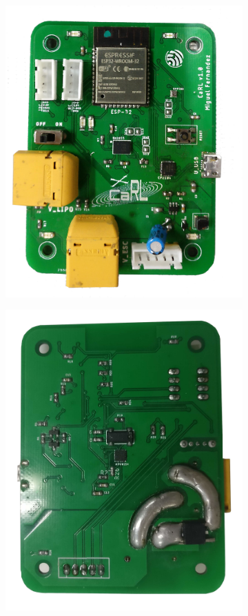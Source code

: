 \begin{figure}[htb!]
	
	\centering
	\begin{subfigure}{0.49\textwidth}
		\centering
		\includegraphics[height=1.2\textwidth]{hardware/AutopilotoFront}
	\end{subfigure}
	\begin{subfigure}{0.49\textwidth}
		\centering
		\includegraphics[height=1.2\textwidth]{hardware/AutopilotoBack}

\end{subfigure}
\end{figure}
